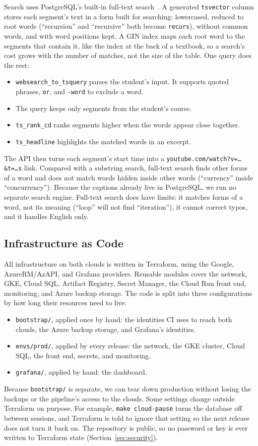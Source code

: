 \documentclass[conference]{IEEEtran}
\begin{document}
Search uses PostgreSQL's built-in full-text search~\cite{searchdoc}. A
generated \texttt{tsvector} column stores each segment's text in a form
built for searching: lowercased, reduced to root words (``recursion'' and
``recursive'' both become \texttt{recurs}), without common words, and with
word positions kept. A GIN index maps each root word to the segments that
contain it, like the index at the back of a textbook, so a search's cost
grows with the number of matches, not the size of the table. One query
does the rest:
\begin{itemize}
\item \texttt{websearch\_to\_tsquery} parses the student's input. It
supports quoted phrases, \texttt{or}, and \texttt{-word} to exclude a word.
\item The query keeps only segments from the student's course.
\item \texttt{ts\_rank\_cd} ranks segments higher when the words appear
close together.
\item \texttt{ts\_headline} highlights the matched words in an excerpt.
\end{itemize}
The API then turns each segment's start time into a
\texttt{youtube.com/watch?v=\ldots\&t=\ldots s} link. Compared with a
substring search, full-text search finds other forms of a word and does
not match words hidden inside other words (``currency'' inside
``concurrency''). Because the captions already live in PostgreSQL, we run
no separate search engine. Full-text search does have limits: it matches
forms of a word, not its meaning (``loop'' will not find ``iteration''),
it cannot correct typos, and it handles English only.

\subsection{Infrastructure as Code}
All infrastructure on both clouds is written in Terraform, using the
Google, AzureRM/AzAPI, and Grafana providers. Reusable modules cover the
network, GKE, Cloud SQL, Artifact Registry, Secret Manager, the Cloud Run
front end, monitoring, and Azure backup storage. The code is split into
three configurations by how long their resources need to live:
\begin{itemize}
\item \texttt{bootstrap/}, applied once by hand: the identities CI uses to
reach both clouds, the Azure backup storage, and Grafana's identities.
\item \texttt{envs/prod/}, applied by every release: the network, the GKE
cluster, Cloud SQL, the front end, secrets, and monitoring.
\item \texttt{grafana/}, applied by hand: the dashboard.
\end{itemize}
Because \texttt{bootstrap/} is separate, we can tear down production
without losing the backups or the pipeline's access to the clouds. Some
settings change outside Terraform on purpose. For example,
\texttt{make cloud-pause} turns the database off between sessions, and
Terraform is told to ignore that setting so the next release does not turn
it back on. The repository is public, so no password or key is ever written
to Terraform state (Section~\ref{sec:security}).
\end{document}
